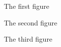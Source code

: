 \begingroup
\setcounter{figure}{0}
\renewcommand{\thefigure}{S\arabic{figure}}
\renewcommand{\theHfigure}{S\arabic{figure}}
\FloatBarrier

\begin{figure}[htbp]
\centering
\caption{The first figure}
\label{fig:supp1}
\end{figure}

\begin{figure}[htbp]
\centering
\caption{The second figure}
\label{fig:supp2}
\end{figure}

\begin{figure}[htbp]
\centering
\caption{The third figure}
\label{fig:supp3}
\end{figure}

\endgroup
